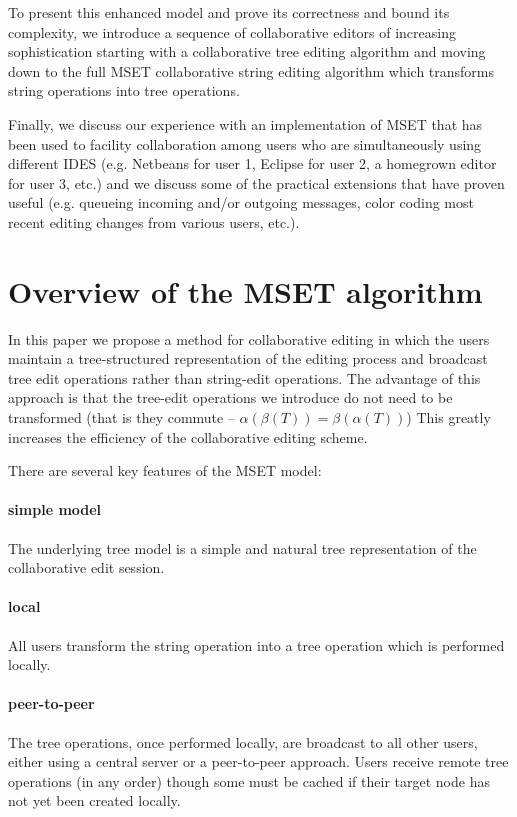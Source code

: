 \documentclass{amsart}
\begin{document}
To present this enhanced model and prove its correctness and bound its complexity,
 we introduce a sequence of collaborative editors of increasing sophistication
starting with a collaborative tree editing algorithm and moving down to the full
MSET collaborative
string editing algorithm which transforms string operations into tree operations.


Finally, we discuss our experience with an implementation of MSET that has been used to facility collaboration among users who are simultaneously using different IDES (e.g. Netbeans for user 1, Eclipse for user 2, a homegrown editor for user 3, etc.) and we discuss some of the practical extensions that have proven useful (e.g. queueing incoming and/or outgoing messages, color coding most recent editing changes from various users, etc.).

\section{Overview of the MSET algorithm}

In this paper we propose a method for collaborative editing in which the
users maintain a tree-structured representation of the editing process and
broadcast tree edit operations rather than string-edit operations. The advantage
of this approach is that the tree-edit operations we introduce do not need to be transformed
(that is they commute -- $\alpha(\beta(T)) = \beta(\alpha(T))$) This greatly increases
the efficiency of the collaborative editing scheme. 


There are several key features of the MSET model:

\paragraph{\bf simple model}
The underlying tree model is a simple and natural tree representation
of the collaborative edit session.

\paragraph{\bf local}
All users transform the string operation into a tree operation
which is performed locally.

\paragraph{\bf peer-to-peer}
The tree operations, once performed locally, are broadcast
to all other users, either using a central server or a peer-to-peer approach.
Users receive remote tree operations (in any order) though some must
be cached if their target node has not yet been created locally.
\end{document}
